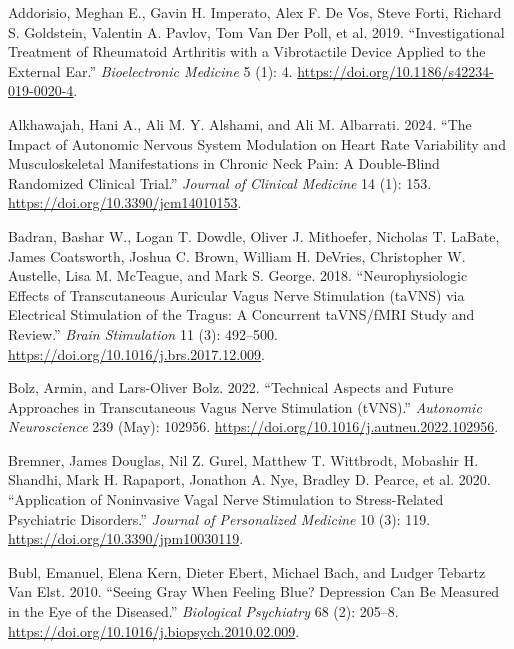 \documentclass[
  Letterpaper,
]{scrbook}
\newlength{\cslhangindent}
\newenvironment{CSLReferences}[2] %
 {\begin{list}{}{%
  \setlength{\itemindent}{0pt}
  \setlength{\leftmargin}{0pt}
  \setlength{\parsep}{0pt}
  \ifodd #1
   \setlength{\leftmargin}{\cslhangindent}
   \setlength{\itemindent}{-1\cslhangindent}
  \fi
  \setlength{\itemsep}{#2\baselineskip}}}
 {\end{list}}
\begin{document}
\label{refs}
\begin{CSLReferences}{1}{0}
Addorisio, Meghan E., Gavin H. Imperato, Alex F. De Vos, Steve Forti,
Richard S. Goldstein, Valentin A. Pavlov, Tom Van Der Poll, et al. 2019.
{``Investigational Treatment of Rheumatoid Arthritis with a Vibrotactile
Device Applied to the External Ear.''} \emph{Bioelectronic Medicine} 5
(1): 4. \url{https://doi.org/10.1186/s42234-019-0020-4}.

Alkhawajah, Hani A., Ali M. Y. Alshami, and Ali M. Albarrati. 2024.
{``The {Impact} of {Autonomic Nervous System Modulation} on {Heart Rate
Variability} and {Musculoskeletal Manifestations} in {Chronic Neck
Pain}: {A Double-Blind Randomized Clinical Trial}.''} \emph{Journal of
Clinical Medicine} 14 (1): 153.
\url{https://doi.org/10.3390/jcm14010153}.

Badran, Bashar W., Logan T. Dowdle, Oliver J. Mithoefer, Nicholas T.
LaBate, James Coatsworth, Joshua C. Brown, William H. DeVries,
Christopher W. Austelle, Lisa M. McTeague, and Mark S. George. 2018.
{``Neurophysiologic Effects of Transcutaneous Auricular Vagus Nerve
Stimulation ({taVNS}) via Electrical Stimulation of the Tragus: {A}
Concurrent {taVNS}/{fMRI} Study and Review.''} \emph{Brain Stimulation}
11 (3): 492--500. \url{https://doi.org/10.1016/j.brs.2017.12.009}.

Bolz, Armin, and Lars-Oliver Bolz. 2022. {``Technical Aspects and Future
Approaches in Transcutaneous Vagus Nerve Stimulation ({tVNS}).''}
\emph{Autonomic Neuroscience} 239 (May): 102956.
\url{https://doi.org/10.1016/j.autneu.2022.102956}.

Bremner, James Douglas, Nil Z. Gurel, Matthew T. Wittbrodt, Mobashir H.
Shandhi, Mark H. Rapaport, Jonathon A. Nye, Bradley D. Pearce, et al.
2020. {``Application of {Noninvasive Vagal Nerve Stimulation} to
{Stress-Related Psychiatric Disorders}.''} \emph{Journal of Personalized
Medicine} 10 (3): 119. \url{https://doi.org/10.3390/jpm10030119}.

Bubl, Emanuel, Elena Kern, Dieter Ebert, Michael Bach, and Ludger
Tebartz Van Elst. 2010. {``Seeing {Gray When Feeling Blue}? {Depression
Can Be Measured} in the {Eye} of the {Diseased}.''} \emph{Biological
Psychiatry} 68 (2): 205--8.
\url{https://doi.org/10.1016/j.biopsych.2010.02.009}.


\end{CSLReferences}
\end{document}
